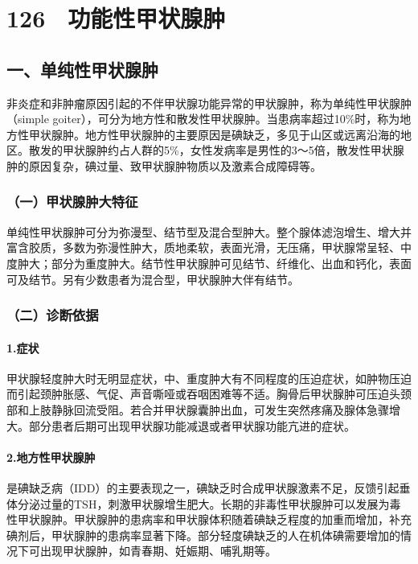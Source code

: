 \protect\hypertarget{text00298.html}{}{}

\section{126　功能性甲状腺肿}

\subsection{一、单纯性甲状腺肿}

非炎症和非肿瘤原因引起的不伴甲状腺功能异常的甲状腺肿，称为单纯性甲状腺肿（simple
goiter），可分为地方性和散发性甲状腺肿。当患病率超过10\%时，称为地方性甲状腺肿。地方性甲状腺肿的主要原因是碘缺乏，多见于山区或远离沿海的地区。散发的甲状腺肿约占人群的5\%，女性发病率是男性的3～5倍，散发性甲状腺肿的原因复杂，碘过量、致甲状腺肿物质以及激素合成障碍等。

\subsubsection{（一）甲状腺肿大特征}

单纯性甲状腺肿可分为弥漫型、结节型及混合型肿大。整个腺体滤泡增生、增大并富含胶质，多数为弥漫性肿大，质地柔软，表面光滑，无压痛，甲状腺常呈轻、中度肿大；部分为重度肿大。结节性甲状腺肿可见结节、纤维化、出血和钙化，表面可及结节。另有少数患者为混合型，甲状腺肿大伴有结节。

\subsubsection{（二）诊断依据}

\paragraph{1.症状}

甲状腺轻度肿大时无明显症状，中、重度肿大有不同程度的压迫症状，如肿物压迫而引起颈肿胀感、气促、声音嘶哑或吞咽困难等不适。胸骨后甲状腺肿可压迫头颈部和上肢静脉回流受阻。若合并甲状腺囊肿出血，可发生突然疼痛及腺体急骤增大。部分患者后期可出现甲状腺功能减退或者甲状腺功能亢进的症状。

\paragraph{2.地方性甲状腺肿}

是碘缺乏病（IDD）的主要表现之一，碘缺乏时合成甲状腺激素不足，反馈引起垂体分泌过量的TSH，刺激甲状腺增生肥大。长期的非毒性甲状腺肿可以发展为毒性甲状腺肿。甲状腺肿的患病率和甲状腺体积随着碘缺乏程度的加重而增加，补充碘剂后，甲状腺肿的患病率显著下降。部分轻度碘缺乏的人在机体碘需要增加的情况下可出现甲状腺肿，如青春期、妊娠期、哺乳期等。

